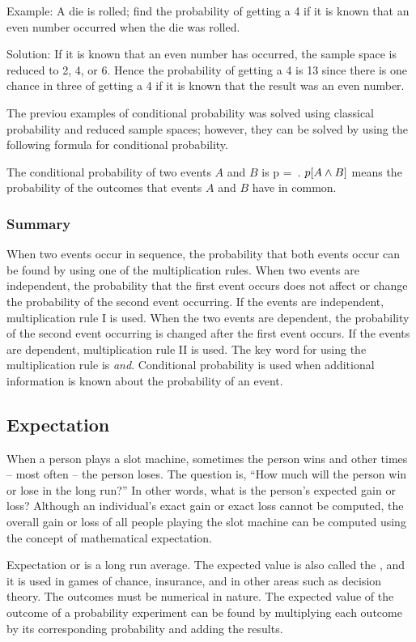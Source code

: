 Example: A die is rolled; find the probability of getting a 4 if it is known that an even number occurred when the die was rolled.

Solution: If it is known that an even number has occurred, the sample space is reduced to 2, 4, or 6. Hence the probability of getting a 4 is 13 since there is one chance in three of getting a 4 if it is known that the result was an even number.

The previou examples of conditional probability was solved using classical probability and reduced sample spaces; however, they can be solved by using the following formula for conditional probability.

The conditional probability of two events $A$ and $B$ is
\beq
p =  \,.
\eeq
$p\!\left[{A\land B}\right]$ means the probability of the outcomes that events $A$ and $B$ have in common.


\subsubsection{Summary}
When two events occur in sequence, the probability that both events occur can be found by using one of the multiplication rules. When two events are independent, the probability that the first event occurs does not affect or change the probability of the second event occurring. If the events are independent, multiplication rule I is used. When the two events are dependent, the probability of the second event occurring is changed after the first event occurs. If the events are dependent, multiplication rule II is used. The key word for using the multiplication rule is \emph{and}. Conditional probability is used when additional information is known about the probability of an event.


\subsection{Expectation}
When a person plays a slot machine, sometimes the person wins and other times -- most often -- the person loses. The question is, ``How much will the person win or lose in the long run?'' In other words, what is the person's expected gain or loss? Although an individual's exact gain or exact loss cannot be computed, the overall gain or loss of all people playing the slot machine can be computed using the concept of mathematical expectation.

Expectation or  is a long run average. The expected value is also called the , and it is used in games of chance, insurance, and in other areas such as decision theory. The outcomes must be numerical in nature. The expected value of the outcome of a probability experiment can be found by multiplying each outcome by its corresponding probability and adding the results.

